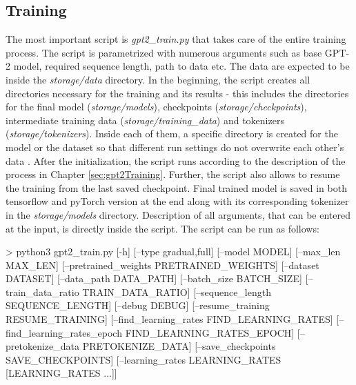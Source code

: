 \subsection*{Training}
The most important script is \textit{gpt2\_train.py} that takes care of the entire training process. The script is parametrized with numerous arguments such as base GPT-2 model, required sequence length, path to data etc. The data are expected to be inside the \textit{storage/data} directory. In the beginning, the script creates all directories necessary for the training and its results - this includes the directories for the final model (\textit{storage/models}), checkpoints (\textit{storage/checkpoints}), intermediate training data (\textit{storage/training\_data}) and tokenizers (\textit{storage/tokenizers}). Inside each of them, a specific directory is created for the model or the dataset so that different run settings do not overwrite each other's data . After the initialization, the script runs according to the description of the process in Chapter \ref{sec:gpt2Training}. Further, the script also allows to resume the training from the last saved checkpoint. Final trained model is saved in both tensorflow and pyTorch version at the end along with its corresponding tokenizer in the \textit{storage/models} directory. Description of all arguments, that can be entered at the input, is directly inside the script. The script can be run as follows:
\newpage
\begin{code}
> python3 gpt2_train.py [-h] [--type {gradual,full}] 
              [--model MODEL] [--max_len MAX_LEN] 
              [--pretrained_weights PRETRAINED_WEIGHTS] 
              [--dataset DATASET] [--data_path DATA_PATH] 
              [--batch_size BATCH_SIZE]
              [--train_data_ratio TRAIN_DATA_RATIO] 
              [--sequence_length SEQUENCE_LENGTH] [--debug DEBUG] 
              [--resume_training RESUME_TRAINING] 
              [--find_learning_rates FIND_LEARNING_RATES]
              [--find_learning_rates_epoch FIND_LEARNING_RATES_EPOCH]
              [--pretokenize_data PRETOKENIZE_DATA] 
              [--save_checkpoints SAVE_CHECKPOINTS] 
              [--learning_rates LEARNING_RATES [LEARNING_RATES ...]]
\end{code}

